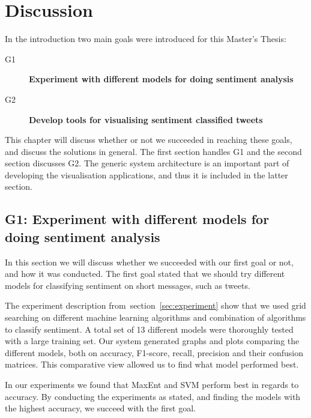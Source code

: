 \chapter{Discussion}

In the introduction two main goals were introduced for this Master's Thesis:

\begin{description}

\item[G1] \textbf{Experiment with different models for doing sentiment analysis}
	
\item[G2] \textbf{Develop tools for visualising sentiment classified tweets}

\end{description}

This chapter will discuss whether or not we succeeded in reaching these goals, and discuss the solutions in general. The first section handles G1 and the second section discusses G2. The generic system architecture is an important part of developing the visualisation applications, and thus it is included in the latter section.

\section{G1: Experiment with different models for doing sentiment analysis}

In this section we will discuss whether we succeeded with our first goal or not, and how it was conducted. The first goal stated that we should try different models for classifying sentiment on short messages, such as tweets. 

The experiment description from~section~\ref{sec:experiment} show that we used grid searching on different machine learning algorithms and combination of algorithms to classify sentiment. A total set of 13 different models were thoroughly tested with a large training set. Our system generated graphs and plots comparing the different models, both on accuracy, F1-score, recall, precision and their confusion matrices. This comparative view allowed us to find what model performed best.

In our experiments we found that MaxEnt and SVM perform best in regards to accuracy. By conducting the experiments as stated, and finding the models with the highest accuracy, we succeed with the first goal.

